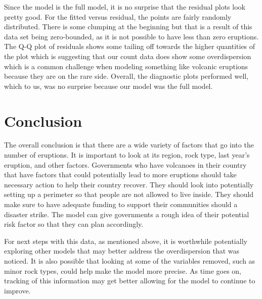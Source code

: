\documentclass[
  12pt,
]{article}
\begin{document}
Since the model is the full model, it is no surprise that the residual
plots look pretty good. For the fitted versus residual, the points are
fairly randomly distributed. There is some clumping at the beginning but
that is a result of this data set being zero-bounded, as it is not
possible to have less than zero eruptions. The Q-Q plot of residuals
shows some tailing off towards the higher quantities of the plot which
is suggesting that our count data does show some overdispersion which is
a common challenge when modeling something like volcanic eruptions
because they are on the rare side. Overall, the diagnostic plots
performed well, which to us, was no surprise because our model was the
full model.

\section{Conclusion}\label{conclusion}

The overall conclusion is that there are a wide variety of factors that
go into the number of eruptions. It is important to look at its region,
rock type, last year's eruption, and other factors. Governments who have
volcanoes in their country that have factors that could potentially lead
to more eruptions should take necessary action to help their country
recover. They should look into potentially setting up a perimeter so
that people are not allowed to live inside. They should make sure to
have adequate funding to support their communities should a disaster
strike. The model can give governments a rough idea of their potential
risk factor so that they can plan accordingly.

For next steps with this data, as mentioned above, it is worthwhile
potentially exploring other models that may better address the
overdispersion that was noticed. It is also possible that looking at
some of the variables removed, such as minor rock types, could help make
the model more precise. As time goes on, tracking of this information
may get better allowing for the model to continue to improve.

\renewcommand\refname{References}
  
\end{document}
